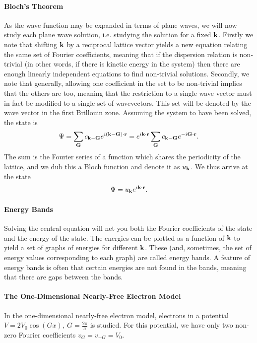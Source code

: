 \paragraph{Bloch's Theorem}
As the wave function may be expanded in terms of plane waves, we will now study each plane wave solution, i.e. studying the solution for a fixed $\vb{k}$. Firstly we note that shifting $\vb{k}$ by a reciprocal lattice vector yields a new equation relating the same set of Fourier coefficients, meaning that if the dispersion relation is non-trivial (in other words, if there is kinetic energy in the system) then there are enough linearly independent equations to find non-trivial solutions. Secondly, we note that generally, allowing one coefficient in the set to be non-trivial implies that the others are too, meaning that the restriction to a single wave vector must in fact be modified to a single set of wavevectors. This set will be denoted by the wave vector in the first Brillouin zone. Assuming the system to have been solved, the state is
\begin{align*}
	\Psi = \sum\limits_{\vb{G}}c_{\vb{k} - \vb{G}}e^{i(\vb{k} - \vb{G})\cdot\vb{r}} = e^{i\vb{k}\cdot\vb{r}}\sum\limits_{\vb{G}}c_{\vb{k} - \vb{G}}e^{-i\vb{G}\cdot\vb{r}}.
\end{align*}
The sum is the Fourier series of a function which shares the periodicity of the lattice, and we dub this a Bloch function and denote it as $u_{\vb{k}}$. We thus arrive at the state
\begin{align*}
	\Psi = u_{\vb{k}}e^{i\vb{k}\cdot\vb{r}}.
\end{align*}

\paragraph{Energy Bands}
Solving the central equation will net you both the Fourier coefficients of the state and the energy of the state. The energies can be plotted as a function of $\vb{k}$ to yield a set of graphs of energies for different $\vb{k}$. These (and, sometimes, the set of energy values corresponding to each graph) are called energy bands. A feature of energy bands is often that certain energies are not found in the bands, meaning that there are gaps between the bands.

\paragraph{The One-Dimensional Nearly-Free Electron Model}
In the one-dimensional nearly-free electron model, electrons in a potential $V = 2V_{0}\cos(Gx),\ G = \frac{2\pi}{a}$ is studied. For this potential, we have only two non-zero Fourier coefficients $v_{G} = v_{-G} = V_{0}$.

